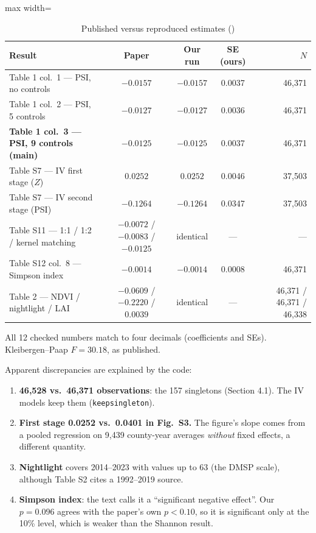 \documentclass[11pt]{article}
\begin{document}
\begin{table}[H]\centering\small
\caption{Published versus reproduced estimates ()}
\begin{adjustbox}{max width=\linewidth}
\begin{tabular}{lcccr}
\toprule
Result & Paper & Our run & SE (ours) & $N$\\
\midrule
Table 1 col.\ 1 --- PSI, no controls & $-0.0157$ & $-0.0157$ & 0.0037 & 46,371\\
Table 1 col.\ 2 --- PSI, 5 controls & $-0.0127$ & $-0.0127$ & 0.0036 & 46,371\\
\textbf{Table 1 col.\ 3 --- PSI, 9 controls (main)} & $\mathbf{-0.0125}$ & $\mathbf{-0.0125}$ & 0.0037 & 46,371\\
Table S7 --- IV first stage ($Z$) & $0.0252$ & $0.0252$ & 0.0046 & 37,503\\
Table S7 --- IV second stage (PSI) & $-0.1264$ & $-0.1264$ & 0.0347 & 37,503\\
Table S11 --- 1:1 / 1:2 / kernel matching & $-0.0072$ / $-0.0083$ / $-0.0125$ & identical & --- & ---\\
Table S12 col.\ 8 --- Simpson index & $-0.0014$ & $-0.0014$ & 0.0008 & 46,371\\
Table 2 --- NDVI / nightlight / LAI & $-0.0609$ / $-0.2220$ / $0.0039$ & identical & --- & 46,371 / 46,371 / 46,338\\
\bottomrule
\end{tabular}
\end{adjustbox}
\par\smallskip\footnotesize All 12 checked numbers match to four decimals (coefficients and SEs). Kleibergen--Paap $F=30.18$, as published.
\end{table}

\noindent Apparent discrepancies are explained by the code:
\begin{enumerate}
\item \textbf{46,528 vs.\ 46,371 observations}: the 157 singletons (Section 4.1). The IV models keep them (\texttt{keepsingleton}).
\item \textbf{First stage 0.0252 vs.\ 0.0401 in Fig.\ S3.} The figure's slope comes from a pooled regression on 9,439 county-year averages \emph{without} fixed effects, a different quantity.
\item \textbf{Nightlight} covers 2014--2023 with values up to 63 (the DMSP scale), although Table S2 cites a 1992--2019 source.
\item \textbf{Simpson index}: the text calls it a ``significant negative effect''. Our $p=0.096$ agrees with the paper's own $p<0.10$, so it is significant only at the 10\% level, which is weaker than the Shannon result.
\end{enumerate}
\end{document}

